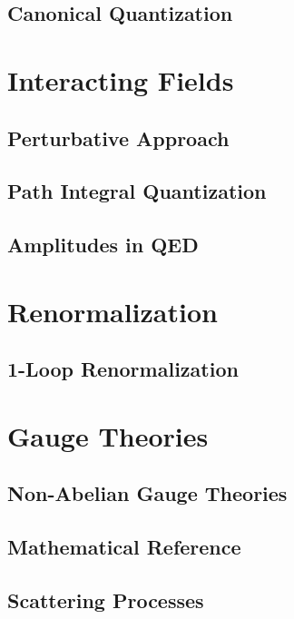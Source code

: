 \documentclass[a4paper, 12pt]{book}
\begin{document}
\chapter{Canonical Quantization}


\part{Interacting Fields}
\pagestyle{body}

\chapter{Perturbative Approach}


\chapter{Path Integral Quantization}


\chapter{Amplitudes in QED}


\part{Renormalization}
\pagestyle{body}

\chapter{1-Loop Renormalization}


\part{Gauge Theories}
\pagestyle{body}

\chapter{Non-Abelian Gauge Theories}


\begin{appendices}
\pagestyle{append}

\chapter{Mathematical Reference}


\chapter{Scattering Processes}


\clearpage
\end{appendices}

\pagestyle{biblio}
\printbibliography[heading = bibintoc, title = {Bibliography}]
\end{document}
